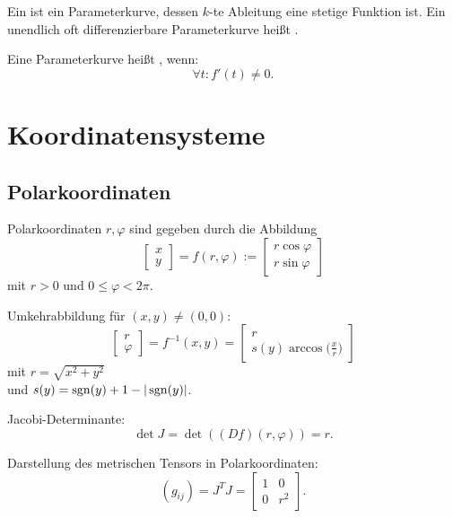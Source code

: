 Ein  ist ein Parameterkurve, dessen $k$-te Ableitung
eine stetige Funktion ist. Ein unendlich oft differenzierbare
Parameterkurve heißt .

Eine Parameterkurve heißt , wenn:
\begin{equation}
\forall t\colon f'(t)\ne 0.
\end{equation}

\section{Koordinatensysteme}
\subsection{Polarkoordinaten}
Polarkoordinaten $r,\varphi$ sind gegeben durch
die Abbildung%
\begin{equation}
\begin{bmatrix}x\\ y\end{bmatrix}
=f(r,\varphi)
:=\begin{bmatrix}
r\cos\varphi\\
r\sin\varphi
\end{bmatrix}
\end{equation}
mit $r>0$ und $0\le\varphi<2\pi$.

Umkehrabbildung für $(x,y)\ne (0,0)$:
\begin{equation}
\begin{bmatrix}r\\ \varphi\end{bmatrix}
= f^{-1}(x,y)
= \begin{bmatrix}
r\\
\displaystyle s(y)\arccos\Big(\frac{x}{r}\Big)
\end{bmatrix}
\end{equation}
mit $r=\sqrt{x^2+y^2}$\\
und $s(y)=\operatorname*{sgn}(y)+1-|\operatorname*{sgn}(y)|$.

Jacobi-Determinante:
\begin{equation}
\det J = \det((Df)(r,\varphi)) =r.
\end{equation}

\pagebreak[3]\noindent
Darstellung des metrischen Tensors in Polarkoordinaten:%
\begin{equation}
(g_{ij}) = J^T J = \begin{bmatrix}
1 & 0\\
0 & r^2
\end{bmatrix}.
\end{equation}

